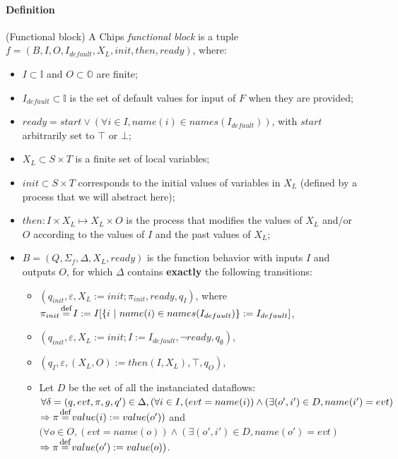 \documentclass{article}
\newcommand{\eqdef}{\stackrel{\mathclap{\normalfont\mbox{\footnotesize def}}}{=}}
\begin{document}
\paragraph{Definition} (Functional block) A Chips \textit{functional block} is a tuple\\$f = (B, I, O, I_{default},X_L, init, then, ready)$, where:
\begin{itemize}
    \item $I \subset \mathbb{I}$ and $O\subset\mathbb{O}$ are finite;
    \item $I_{default} \subset \mathbb{I}$ is the set of default values for input of $F$ when they are provided;
    \item $ready = start \vee (\forall i \in I, name(i) \in names(I_{default}))$, with $start$ arbitrarily set to $\top$ or $\bot$;
    \item $X_L \subset S \times T$ is a finite set of local variables;
    \item $init \subset S \times T$ corresponds to the initial values of variables in $X_L$ (defined by a process that we will abstract here);
    \item $then : I \times X_L \mapsto X_L \times O$ is the process that modifies the values of $X_L$ and/or $O$ according to the values of $I$ and the past values of $X_L$;
    \item $B = (Q,\Sigma_f,\Delta, X_L, ready)$ is the function behavior with inputs $I$ and outputs $O$, for which $\Delta$ contains \textbf{exactly} the following transitions:
    \begin{itemize}
        \item $(q_{init}, \varepsilon, X_L:= init; \pi_{init},ready,q_I)$, where \\
        $\pi_{init} \eqdef I := I[\{ i~|~name(i) \in names(I_{default}) \} := I_{default}]$,
        \item $(q_{init}, \varepsilon, X_L:= init; I:=I_{default}, \neg ready, q_\emptyset)$,
        \item $(q_I, \varepsilon, (X_L,O) := then(I,X_L),\top, q_O)$,
        \item Let $D$ be the set of all the instanciated dataflows:\\
        $\forall \delta = (q,evt,\pi,g,q') \in \Delta,\\
        (\forall i\in I, (evt = name(i)) \wedge (\exists (o',i') \in D, name(i') = evt)$\\
        $ \Rightarrow \pi \eqdef value(i) := value(o'))$ and \\
        $(\forall o\in O, (evt = name(o)) \wedge (\exists (o',i') \in D, name(o') = evt)$\\
        $ \Rightarrow \pi \eqdef value(o') := value(o))$.
    \end{itemize}
\end{itemize}
\end{document}
